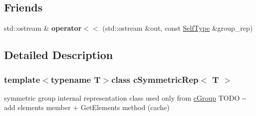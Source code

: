\subsection*{\-Friends}
\begin{DoxyCompactItemize}
\item 
\hypertarget{classcSymmetricRep_ad73abea0c910e6d44cac98fd4bc1a8a8}{std\-::ostream \& {\bfseries operator$<$$<$} (std\-::ostream \&out, const \hyperlink{classcSymmetricRep}{\-Self\-Type} \&group\-\_\-rep)}\label{classcSymmetricRep_ad73abea0c910e6d44cac98fd4bc1a8a8}

\end{DoxyCompactItemize}


\subsection{\-Detailed \-Description}
\subsubsection*{template$<$typename T$>$class c\-Symmetric\-Rep$<$ T $>$}

symmetric group internal representation class used only from \hyperlink{classcGroup}{c\-Group} \-T\-O\-D\-O -\/-\/ add elements member + \-Get\-Elements method (cache) 

